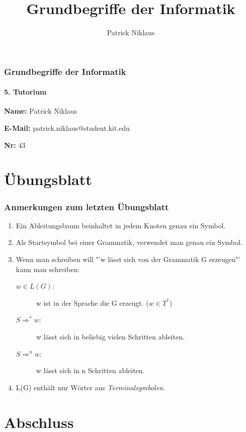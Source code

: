 \documentclass{beamer}
\title{Grundbegriffe der Informatik}
\author{Patrick Niklaus}
\begin{document}
\begin{frame}
  \frametitle{Grundbegriffe der Informatik}
  \framesubtitle{5. Tutorium}
  \begin{description}
    \item \textbf{Name:} Patrick Niklaus
    \item \textbf{E-Mail:} patrick.niklaus@student.kit.edu
    \item \textbf{Nr:} 43
  \end{description}
\end{frame}

\section{Übungsblatt}
\begin{frame}
  \frametitle{Anmerkungen zum letzten Übungsblatt}
  \begin{enumerate}
    \item Ein Ableitungsbaum beinhaltet in jedem Knoten genau ein Symbol.
    \item Als Startsymbol bei einer Grammatik, verwendet man genau ein Symbol.
    \item Wenn man schreiben will "'w lässt sich von der Grammatik G erzeugen"' kann man schreiben:
      \begin{description}
        \item[$w \in L(G)$:] w ist in der Sprache die G erzeugt. ($w \in T^*$)
        \item[$S \Longrightarrow^* w$:] w lässt sich in beliebig vielen Schritten ableiten.
        \item[$S \Longrightarrow^n w$:] w lässt sich in n Schritten ableiten.
      \end{description}
    \item L(G) enthält nur Wörter aus \emph{Terminalsymbolen}.
  \end{enumerate}
\end{frame}



\section{Abschluss}
\end{document}
